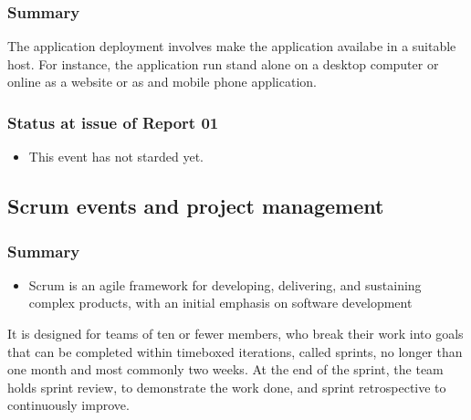 \documentclass{article}
\begin{document}
\begin{enumerate}
\subsubsection{Summary}
\label{sec:org1b81dbc}
The application deployment involves make the application availabe in a suitable host.
For instance, the application run stand alone on a desktop computer or online as a website or as and mobile phone application.
\subsubsection{Status at issue of Report 01}
\label{sec:orge0301d6}
\begin{itemize}
\item This event has not starded yet.
\end{itemize}

\subsection{Scrum events and project management}
\label{sec:org1cb0c37}
\subsubsection{Summary}
\label{sec:org6b409e9}
\begin{itemize}
\item Scrum is an agile framework for developing, delivering, and sustaining complex products, with an initial emphasis on software development
\end{itemize}
It is designed for teams of ten or fewer members, who break their work into goals that can be completed within timeboxed iterations, called sprints, no longer than one month and most commonly two weeks.
At the end of the sprint, the team holds sprint review, to demonstrate the work done, and sprint retrospective to continuously improve.

\end{enumerate}
\end{document}
